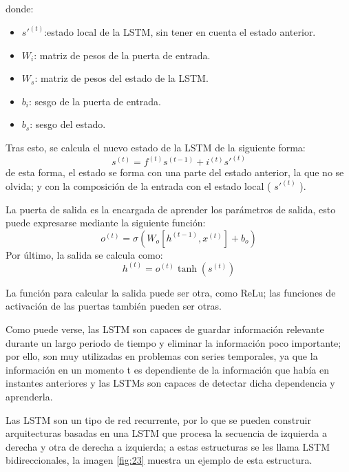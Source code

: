 \noindent donde:
\begin{itemize}
	\item $s'^{(t)}$:estado local de la LSTM, sin tener en cuenta el estado anterior.
	\item $W_i$: matriz de pesos de la puerta de entrada.
	\item $W_s$: matriz de pesos del estado de la LSTM.
	\item $b_i $: sesgo de la puerta de entrada.
	\item $b_s$: sesgo del estado.
\end{itemize}
\verticalspace

Tras esto, se calcula el nuevo estado de la LSTM de la siguiente forma:\newline
$$ s^{(t)} = f^{(t)}s^{(t-1)} + i^{(t)} s'^{(t)} $$
de esta forma, el estado se forma con una parte del estado anterior, la que no se olvida; y con la composición de la entrada con el estado local ( $s'^{(t)}$ ).
\verticalspace

La puerta de salida es la encargada de aprender los parámetros de salida, esto puede expresarse mediante la siguiente función:\newline
$$ o^{(t)} = \sigma(W_o[h^{(t-1)}, x^{(t)}] + b_o) $$
Por último, la salida se calcula como:\newline
$$h^{(t)} = o^{(t)}\tanh(s^{(t)}) $$

La función para calcular la salida puede ser otra, como ReLu; las funciones de activación de las puertas también pueden ser otras.\newline

Como puede verse, las LSTM son capaces de guardar información relevante durante un largo periodo de tiempo y eliminar la información poco importante; por ello, son muy utilizadas en problemas con series temporales, ya que la información en un momento t es dependiente de la información que había en instantes anteriores y las LSTMs son capaces de detectar dicha dependencia y aprenderla.\newline

Las LSTM son un tipo de red recurrente, por lo que se pueden construir arquitecturas basadas en una LSTM que procesa la secuencia de izquierda a derecha y otra de derecha a izquierda; a estas estructuras se les llama LSTM bidireccionales, la imagen \ref{fig:23} muestra un ejemplo de esta estructura.\newline
\newpage

